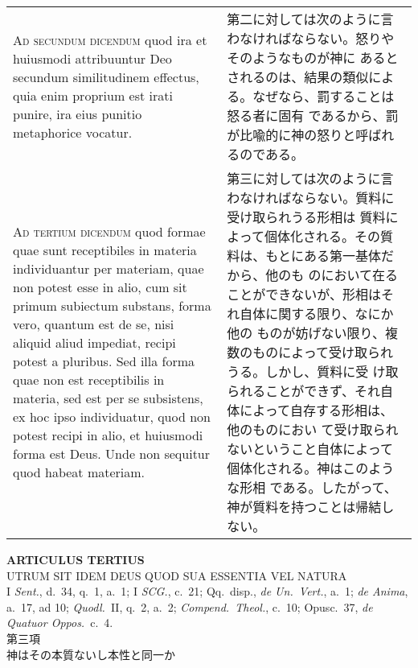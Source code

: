 \documentclass[10pt]{jsarticle} %
\begin{document}
\begin{longtable}{p{21em}p{21em}}
\textsc{Ad secundum dicendum} quod ira et huiusmodi attribuuntur Deo
 secundum similitudinem effectus, quia enim proprium est irati punire,
 ira eius punitio metaphorice vocatur.

&

第二に対しては次のように言わなければならない。怒りやそのようなものが神に
 あるとされるのは、結果の類似による。なぜなら、罰することは怒る者に固有
 であるから、罰が比喩的に神の怒りと呼ばれるのである。


\\


\textsc{Ad tertium dicendum} quod formae quae sunt receptibiles in
 materia individuantur per materiam, quae non potest esse in alio, cum
 sit primum subiectum substans, forma vero, quantum est de se, nisi
 aliquid aliud impediat, recipi potest a pluribus. Sed illa forma quae
 non est receptibilis in materia, sed est per se subsistens, ex hoc ipso
 individuatur, quod non potest recipi in alio, et huiusmodi forma est
 Deus. Unde non sequitur quod habeat materiam.

&

第三に対しては次のように言わなければならない。質料に受け取られうる形相は
 質料によって個体化される。その質料は、もとにある第一基体だから、他のも
 のにおいて在ることができないが、形相はそれ自体に関する限り、なにか他の
 ものが妨げない限り、複数のものによって受け取られうる。しかし、質料に受
 け取られることができず、それ自体によって自存する形相は、他のものにおい
 て受け取られないということ自体によって個体化される。神はこのような形相
 である。したがって、神が質料を持つことは帰結しない。



\end{longtable}


\newpage
{}

\begin{center}
 {\Large {\bf ARTICULUS TERTIUS}}\\
 {\large UTRUM SIT IDEM DEUS QUOD SUA ESSENTIA VEL NATURA}\\
 {\footnotesize I \textit{Sent.}, d.~34, q.~1, a.~1; I \textit{SCG.},
 c.~21; Qq.~disp., \textit{de Un.~Vert.}, a.~1; \textit{de Anima},
 a.~17, ad 10; \textit{Quodl.}~II, q.~2, a.~2; \textit{Compend.~Theol.},
 c.~10; Opusc.~37, \textit{de Quatuor Oppos.}~c.~4.}\\
{\Large 第三項\\神はその本質ないし本性と同一か}

\end{center}
\end{document}
